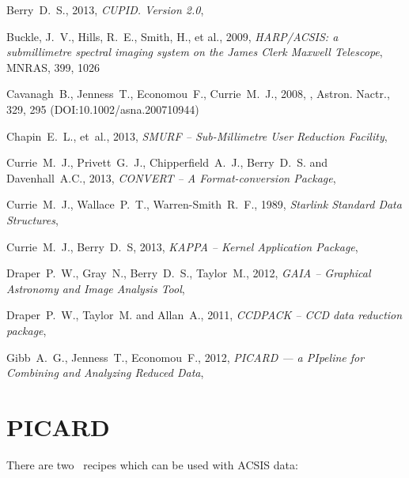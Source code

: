 \documentclass[11pt,oneside,chapters]{starlink}
\begin{document}
\clearpage

\begin{thebibliography}{}


Berry~D.~S., 2013, \textit{CUPID. Version 2.0}, 

Buckle, J.~V., Hills, R.~E., Smith, H., et al., 2009,
\textit{HARP/ACSIS: a submillimetre spectral imaging system on the James Clerk Maxwell Telescope},
MNRAS, 399, 1026

Cavanagh~B., Jenness~T., Economou~F., Currie~M.~J., 2008,
, Astron. Nactr., 329, 295 (DOI:10.1002/asna.200710944)

Chapin~E.~L., et~al., 2013, \textit{SMURF -- Sub-Millimetre User Reduction
Facility}, 

Currie~M.~J., Privett~G.~J., Chipperfield~A.~J., Berry~D.~S. and Davenhall~A.C., 2013,
\textit{CONVERT -- A Format-conversion Package}, 

Currie~M.~J., Wallace~P.~T., Warren-Smith~R.~F., 1989,
\textit{Starlink Standard Data Structures}, 

Currie~M.~J., Berry~D.~S, 2013, \textit{KAPPA -- Kernel Application Package},

Draper~P.~W., Gray~N., Berry~D.~S., Taylor~M., 2012,
\textit{GAIA -- Graphical Astronomy and Image Analysis Tool},

Draper~P.~W., Taylor~M. and Allan~A., 2011, \textit{CCDPACK -- CCD data reduction package},

Gibb~A.~G., Jenness~T., Economou~F., 2012, \textit{PICARD --- a
PIpeline for Combining and Analyzing Reduced Data},

\end{thebibliography}

\newpage
\appendix

\chapter{PICARD}
\label{app:picard}
There are two \picard\ recipes which can be used with ACSIS data:
\end{document}
